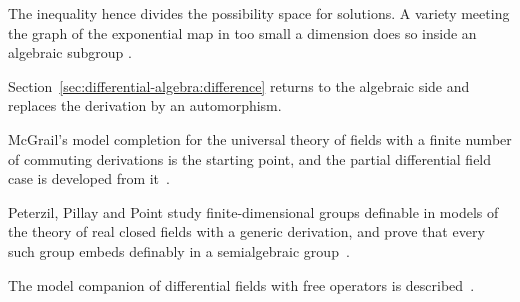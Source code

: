 The inequality hence divides the possibility space for solutions. A variety
meeting the graph of the exponential map in too small a dimension does so
inside an algebraic subgroup \cite[Theorem~2.2]{Aslanyan2018}.

Section~\ref{sec:differential-algebra:difference} returns to the
algebraic side and replaces the derivation by an automorphism.

McGrail's model completion for the universal theory of fields with a finite number of commuting derivations is the starting point, and the partial differential field case is developed from it~\cite{WlModelTheoryOfPartialDifferenti2019}.

Peterzil, Pillay and Point study finite-dimensional groups definable in models of the theory of real closed fields with a generic derivation, and prove that every such group embeds definably in a semialgebraic group~\cite{WlOnDefinableGroupsInRealClosedF2022}.

The model companion of differential fields with free operators is described~\cite{WlTheModelCompanionOfDifferentia2020}.
